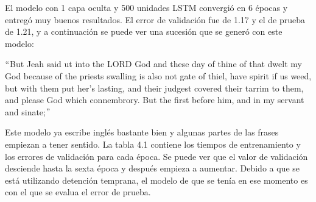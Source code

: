 \vspace{1em}

El modelo con 1 capa oculta y 500 unidades LSTM convergió en 6 épocas y entregó muy buenos resultados. El error de validación fue de 1.17 y el de prueba de 1.21, y a continuación se puede ver una sucesión que se generó con este modelo:

\vspace{1em}

$``$But Jeah said ut into the LORD God and these day of thine of that dwelt my God because of the priests swalling is also not gate of thiel, have spirit if us weed, but with them put her's lasting, and their judgest covered their tarrim to them, and please God which connembrory. But the first before him, and in my servant and sinate;$"$

\vspace{1em}

Este modelo ya escribe inglés bastante bien y algunas partes de las frases empiezan a tener sentido. La tabla 4.1 contiene los tiempos de entrenamiento y los errores de validación para cada época. Se puede ver que el valor de validación desciende hasta la sexta época y después empieza a aumentar. Debido a que se está utilizando detención temprana, el modelo de que se tenía en ese momento es con el que se evalua el error de prueba.

\vspace{1em}



